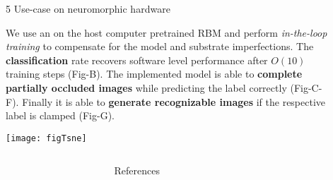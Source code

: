 \begin{frame}
\begin{columns}
\begin{column}{0.99\textwidth}
\begin{columns}[t]
\begin{column}{0.32\textwidth}
\begin{block}{\large 5 Use-case on neuromorphic hardware}
					\begin{adjustwidth}{1.cm}{1.cm}
					\justify
					We use an on the host computer pretrained RBM and perform \textit{in-the-loop training } to compensate for the model and substrate imperfections.
					The \textbf{classification} rate recovers software level performance after $O(10)$ training steps (Fig-B).
					The implemented model is able to \textbf{complete partially occluded images} while predicting the label correctly (Fig-C-F).
					Finally it is able to \textbf{generate recognizable images} if the respective label is clamped (Fig-G).

					\end{adjustwidth}
					\thirdBlockImSpace
					\begin{center}
						\texttt{[image: figTsne]}
					\end{center}

					
					\blockSpaceTwo
					\end{block}


					\interBlockSpaceTwo




				\end{column}

				\begin{column}{.005\textwidth}\end{column}


			\end{columns}



		\end{column}
		\begin{column}{.005\textwidth}\end{column}
	\end{columns}

	\vspace{0cm}

	\begin{columns}[t]
		\begin{column}{.01\textwidth}\end{column}

		\begin{column}{.98\textwidth}
			\begin{block}{References}
			 \begin{minipage}{0.79\linewidth}
								\tiny
								
								
			 \end{minipage}

			\end{block}
		\end{column}

		\begin{column}{.01\textwidth}\end{column}
	\end{columns}

\end{frame} %
